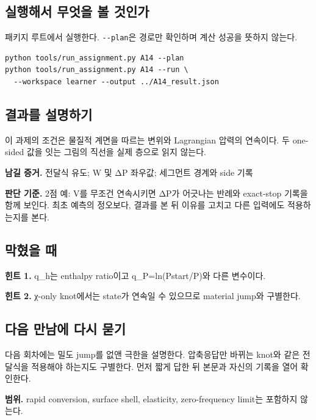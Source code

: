 \documentclass[
  10pt,
  a4paper,
]{article}
\begin{document}
\newpage

\subsection{실행해서 무엇을 볼
것인가}\label{uxc2e4uxd589uxd574uxc11c-uxbb34uxc5c7uxc744-uxbcfc-uxac83uxc778uxac00}

패키지 루트에서 실행한다. \texttt{-\/-plan}은 경로만 확인하며 계산
성공을 뜻하지 않는다.

\begin{verbatim}
python tools/run_assignment.py A14 --plan
python tools/run_assignment.py A14 --run \
  --workspace learner --output ../A14_result.json
\end{verbatim}

\subsection{결과를
설명하기}\label{uxacb0uxacfcuxb97c-uxc124uxba85uxd558uxae30}

이 과제의 조건은 물질적 계면을 따르는 변위와 Lagrangian 압력의 연속이다.
두 one-sided 값을 잇는 그림의 직선을 실제 층으로 읽지 않는다.

\textbf{남길 증거.} 전달식 유도; W 및 ΔP 좌우값; 세그먼트 경계와 side
기록

\textbf{판단 기준.} 2점 예: V를 무조건 연속시키면 ΔP가 어긋나는 반례와
exact-stop 기록을 함께 보인다. 최초 예측의 정오보다, 결과를 본 뒤 이유를
고치고 다른 입력에도 적용하는지를 본다.

\subsection{막혔을 때}\label{uxb9c9uxd614uxc744-uxb54c}

\textbf{힌트 1.} q\_h는 enthalpy ratio이고 q\_P=ln(Pstart/P)와 다른
변수이다.

\textbf{힌트 2.} χ-only knot에서는 state가 연속일 수 있으므로 material
jump와 구별한다.

\subsection{다음 만남에 다시
묻기}\label{uxb2e4uxc74c-uxb9ccuxb0a8uxc5d0-uxb2e4uxc2dc-uxbb3buxae30}

다음 회차에는 밀도 jump를 없앤 극한을 설명한다. 압축응답만 바뀌는 knot와
같은 전달식을 적용해야 하는지도 구별한다. 먼저 짧게 답한 뒤 본문과
자신의 기록을 열어 확인한다.

\textbf{범위.} rapid conversion, surface shell, elasticity,
zero-frequency limit는 포함하지 않는다.
\end{document}

